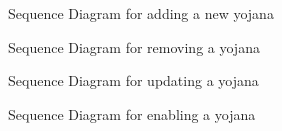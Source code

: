 \documentclass[conference]{IEEEtran}
\begin{document}
\begin{figure}[h!]
\centering
{}
\caption{Sequence Diagram for adding a new yojana}
\end{figure}
\begin{figure}[h!]
\centering
{}
\caption{Sequence Diagram for removing a yojana}
\end{figure}
\begin{figure}[h!]
\centering
{}
\caption{Sequence Diagram for updating a yojana}
\end{figure}
\begin{figure}[h!]
\centering
{}
\caption{Sequence Diagram for enabling a yojana}
\end{figure}
\end{document}
